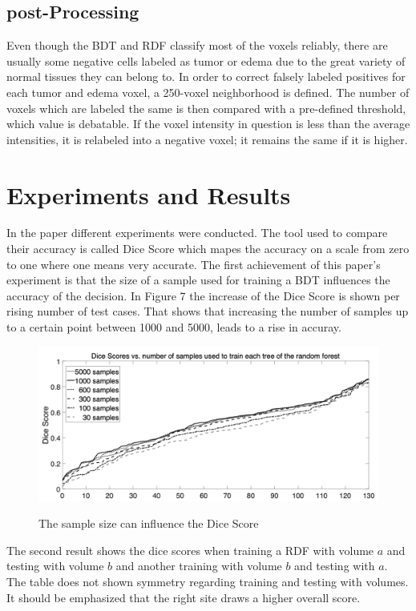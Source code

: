 \documentclass[
12pt,
headsepline,
bibliography=totoc,
twoside=semi,
fleqn
]{scrartcl}
\begin{document}
 \subsection{post-Processing\label{sec:sec3-4}}
 Even though the BDT and RDF classify most of the voxels reliably, there are usually some negative cells labeled as tumor or edema due to the great variety of normal tissues they can belong to. In order to correct falsely labeled positives for each tumor and edema voxel, a 250-voxel neighborhood is defined. The number of voxels which are labeled the same is then compared with a pre-defined threshold, which value is debatable. If the voxel intensity in question is less than the average intensities, it is relabeled into a negative voxel; it remains the same if it is higher.

 \newpage
\section{Experiments and Results\label{sec:sec4}}

 In the paper different experiments were conducted. The tool used to compare their accuracy is called Dice Score which mapes the accuracy on a scale from zero to one where one means very accurate. 
 The first achievement of this paper's experiment is that the size of a sample used for training a BDT influences the accuracy of the decision. In Figure 7 the increase of the Dice Score is shown per rising number of test cases. That shows that increasing the number of samples up to a certain point between 1000 and 5000, leads to a rise in accuray.
 
 \begin{figure}[H]
 \centering \includegraphics[scale=0.7]{BDT16.png}\label{fig:test}
 \caption{The sample size can influence the Dice Score}
 \end{figure} 

 The second result shows the dice scores when training a RDF with volume $a$ and testing with volume $b$ and another training with volume $b$ and testing with $a$. The table does not shown symmetry regarding training and testing with volumes. It should be emphasized that the right site draws a higher overall score. 
\end{document}
